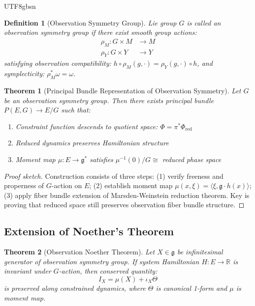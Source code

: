 \documentclass[a4paper,12pt]{extarticle}
\newtheorem{theorem}{Theorem}
\newtheorem{definition}{Definition}
\theoremstyle{definition}
\begin{document}
\begin{CJK}{UTF8}{gbsn}
\begin{definition}[Observation Symmetry Group]
Lie group $G$ is called an observation symmetry group if there exist smooth group actions:
\begin{align*}
\rho_M: G \times M &\to M \\
\rho_Y: G \times Y &\to Y
\end{align*}
satisfying observation compatibility: $h \circ \rho_M(g, \cdot) = \rho_Y(g, \cdot) \circ h$, and symplecticity: $\rho_M^*\omega = \omega$.
\end{definition}

\begin{theorem}[Principal Bundle Representation of Observation Symmetry]
Let $G$ be an observation symmetry group. Then there exists principal bundle $P(E, G) \to E/G$ such that:
\begin{enumerate}[label=(\arabic*)]
\item Constraint function descends to quotient space: $\Phi = \pi^*\Phi_{\text{red}}$
\item Reduced dynamics preserves Hamiltonian structure
\item Moment map $\mu: E \to \mathfrak{g}^*$ satisfies $\mu^{-1}(0)/G \cong$ reduced phase space
\end{enumerate}
\end{theorem}

\begin{proof}[Proof sketch]
Construction consists of three steps: (1) verify freeness and properness of $G$-action on $E$; (2) establish moment map $\mu(x, \xi) = \langle \xi, \mathfrak{g} \cdot h(x) \rangle$; (3) apply fiber bundle extension of Marsden-Weinstein reduction theorem\cite{marsden1974reduction}. Key is proving that reduced space still preserves observation fiber bundle structure.
\end{proof}

\subsection{Extension of Noether's Theorem}

\begin{theorem}[Observation Noether Theorem]
Let $X \in \mathfrak{g}$ be infinitesimal generator of observation symmetry group. If system Hamiltonian $H: E \to \mathbb{R}$ is invariant under $G$-action, then conserved quantity:
$$I_X = \mu(X) + \iota_X \Theta$$
is preserved along constrained dynamics, where $\Theta$ is canonical 1-form and $\mu$ is moment map.
\end{theorem}


\end{CJK}
\end{document}
